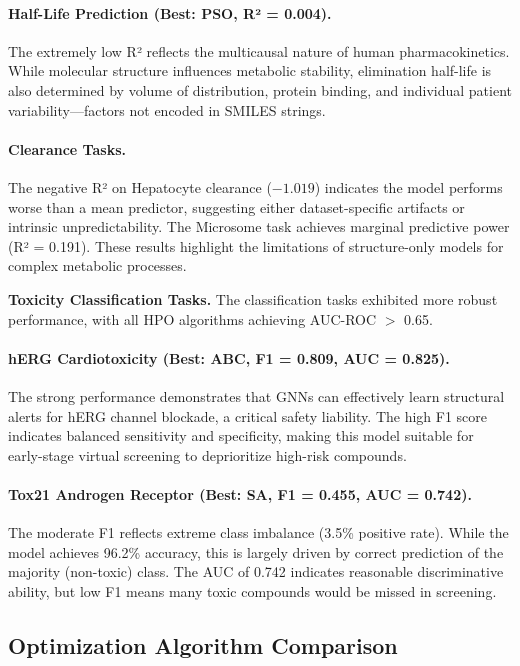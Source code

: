 \documentclass[12pt]{article}
\begin{document}
\paragraph{Half-Life Prediction (Best: PSO, R² = 0.004).} The extremely low R² reflects the multicausal nature of human pharmacokinetics. While molecular structure influences metabolic stability, elimination half-life is also determined by volume of distribution, protein binding, and individual patient variability—factors not encoded in SMILES strings.

\paragraph{Clearance Tasks.} The negative R² on Hepatocyte clearance ($-1.019$) indicates the model performs worse than a mean predictor, suggesting either dataset-specific artifacts or intrinsic unpredictability. The Microsome task achieves marginal predictive power (R² = 0.191). These results highlight the limitations of structure-only models for complex metabolic processes.

\textbf{Toxicity Classification Tasks.} The classification tasks exhibited more robust performance, with all HPO algorithms achieving AUC-ROC $>$ 0.65.

\paragraph{hERG Cardiotoxicity (Best: ABC, F1 = 0.809, AUC = 0.825).} The strong performance demonstrates that GNNs can effectively learn structural alerts for hERG channel blockade, a critical safety liability. The high F1 score indicates balanced sensitivity and specificity, making this model suitable for early-stage virtual screening to deprioritize high-risk compounds.

\paragraph{Tox21 Androgen Receptor (Best: SA, F1 = 0.455, AUC = 0.742).} The moderate F1 reflects extreme class imbalance (3.5\% positive rate). While the model achieves 96.2\% accuracy, this is largely driven by correct prediction of the majority (non-toxic) class. The AUC of 0.742 indicates reasonable discriminative ability, but low F1 means many toxic compounds would be missed in screening.

\subsection{Optimization Algorithm Comparison}
\label{sec:optimizer_comparison}
\end{document}
